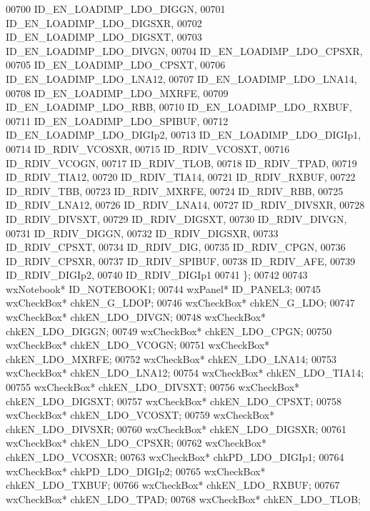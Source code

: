 \begin{DoxyCode}
00700             ID_EN_LOADIMP_LDO_DIGGN,
00701             ID_EN_LOADIMP_LDO_DIGSXR,
00702             ID_EN_LOADIMP_LDO_DIGSXT,
00703             ID_EN_LOADIMP_LDO_DIVGN,
00704             ID_EN_LOADIMP_LDO_CPSXR,
00705             ID_EN_LOADIMP_LDO_CPSXT,
00706             ID_EN_LOADIMP_LDO_LNA12,
00707             ID_EN_LOADIMP_LDO_LNA14,
00708             ID_EN_LOADIMP_LDO_MXRFE,
00709             ID_EN_LOADIMP_LDO_RBB,
00710             ID_EN_LOADIMP_LDO_RXBUF,
00711             ID_EN_LOADIMP_LDO_SPIBUF,
00712             ID_EN_LOADIMP_LDO_DIGIp2,
00713             ID_EN_LOADIMP_LDO_DIGIp1,
00714             ID_RDIV_VCOSXR,
00715             ID_RDIV_VCOSXT,
00716             ID_RDIV_VCOGN,
00717             ID_RDIV_TLOB,
00718             ID_RDIV_TPAD,
00719             ID_RDIV_TIA12,
00720             ID_RDIV_TIA14,
00721             ID_RDIV_RXBUF,
00722             ID_RDIV_TBB,
00723             ID_RDIV_MXRFE,
00724             ID_RDIV_RBB,
00725             ID_RDIV_LNA12,
00726             ID_RDIV_LNA14,
00727             ID_RDIV_DIVSXR,
00728             ID_RDIV_DIVSXT,
00729             ID_RDIV_DIGSXT,
00730             ID_RDIV_DIVGN,
00731             ID_RDIV_DIGGN,
00732             ID_RDIV_DIGSXR,
00733             ID_RDIV_CPSXT,
00734             ID_RDIV_DIG,
00735             ID_RDIV_CPGN,
00736             ID_RDIV_CPSXR,
00737             ID_RDIV_SPIBUF,
00738             ID_RDIV_AFE,
00739             ID_RDIV_DIGIp2,
00740             ID\_RDIV\_DIGIp1
00741         \};
00742         
00743         wxNotebook* ID_NOTEBOOK1;
00744         wxPanel* ID_PANEL3;
00745         wxCheckBox* chkEN_G_LDOP;
00746         wxCheckBox* chkEN_G_LDO;
00747         wxCheckBox* chkEN_LDO_DIVGN;
00748         wxCheckBox* chkEN_LDO_DIGGN;
00749         wxCheckBox* chkEN_LDO_CPGN;
00750         wxCheckBox* chkEN_LDO_VCOGN;
00751         wxCheckBox* chkEN_LDO_MXRFE;
00752         wxCheckBox* chkEN_LDO_LNA14;
00753         wxCheckBox* chkEN_LDO_LNA12;
00754         wxCheckBox* chkEN_LDO_TIA14;
00755         wxCheckBox* chkEN_LDO_DIVSXT;
00756         wxCheckBox* chkEN_LDO_DIGSXT;
00757         wxCheckBox* chkEN_LDO_CPSXT;
00758         wxCheckBox* chkEN_LDO_VCOSXT;
00759         wxCheckBox* chkEN_LDO_DIVSXR;
00760         wxCheckBox* chkEN_LDO_DIGSXR;
00761         wxCheckBox* chkEN_LDO_CPSXR;
00762         wxCheckBox* chkEN_LDO_VCOSXR;
00763         wxCheckBox* chkPD_LDO_DIGIp1;
00764         wxCheckBox* chkPD_LDO_DIGIp2;
00765         wxCheckBox* chkEN_LDO_TXBUF;
00766         wxCheckBox* chkEN_LDO_RXBUF;
00767         wxCheckBox* chkEN_LDO_TPAD;
00768         wxCheckBox* chkEN_LDO_TLOB;

\end{DoxyCode}

